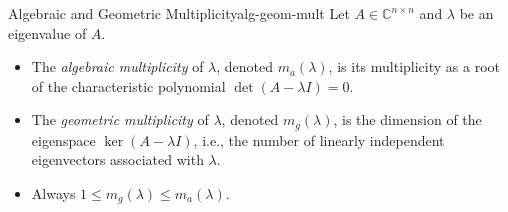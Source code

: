 \begin{definition}{Algebraic and Geometric Multiplicity}{alg-geom-mult}
    Let \(A \in \mathbb{C}^{n \times n}\) and \(\lambda\) be an eigenvalue of \(A\).
    \begin{itemize}[nosep]
        \item The \emph{algebraic multiplicity} of \(\lambda\), denoted \(m_a(\lambda)\), is its multiplicity as a root of the characteristic polynomial \(\det(A - \lambda I) = 0\).
        \item The \emph{geometric multiplicity} of \(\lambda\), denoted \(m_g(\lambda)\), is the dimension of the eigenspace \(\ker(A - \lambda I)\), i.e., the number of linearly independent eigenvectors associated with \(\lambda\).
        \item Always \(1 \leq m_g(\lambda) \leq m_a(\lambda)\).
    \end{itemize}
\end{definition}

